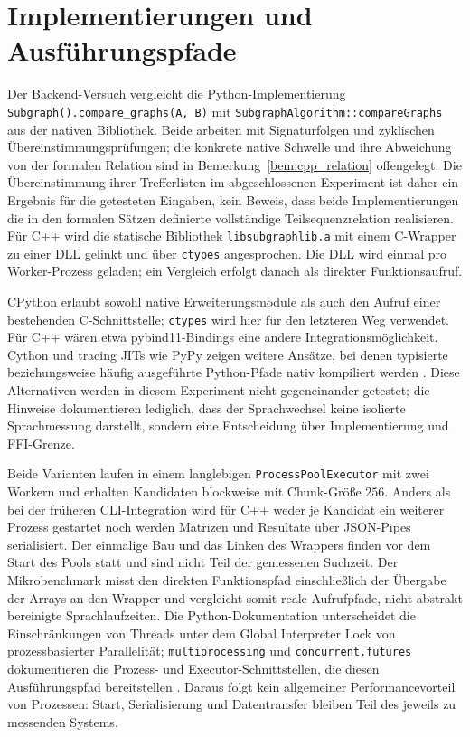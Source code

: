 \documentclass[a4paper,12pt, twoside]{report}
\theoremstyle{definition}
\begin{document}
\section{Implementierungen und Ausführungspfade}
\label{sec:backend_implementierungen}

Der Backend-Versuch vergleicht die Python-Implementierung \texttt{Subgraph().compare\_graphs(A, B)} mit \texttt{SubgraphAlgorithm::compareGraphs} aus der nativen Bibliothek. Beide arbeiten mit Signaturfolgen und zyklischen Übereinstimmungsprüfungen; die konkrete native Schwelle und ihre Abweichung von der formalen Relation sind in Bemerkung~\ref{bem:cpp_relation} offengelegt. Die Übereinstimmung ihrer Trefferlisten im abgeschlossenen Experiment ist daher ein Ergebnis für die getesteten Eingaben, kein Beweis, dass beide Implementierungen die in den formalen Sätzen definierte vollständige Teilsequenzrelation realisieren. Für C++ wird die statische Bibliothek \texttt{libsubgraphlib.a} mit einem C-Wrapper zu einer DLL gelinkt und über \texttt{ctypes} angesprochen. Die DLL wird einmal pro Worker-Prozess geladen; ein Vergleich erfolgt danach als direkter Funktionsaufruf.

CPython erlaubt sowohl native Erweiterungsmodule als auch den Aufruf einer bestehenden C-Schnittstelle; \texttt{ctypes} wird hier für den letzteren Weg verwendet. Für C++ wären etwa pybind11-Bindings eine andere Integrationsmöglichkeit. Cython und tracing JITs wie PyPy zeigen weitere Ansätze, bei denen typisierte beziehungsweise häufig ausgeführte Python-Pfade nativ kompiliert werden \cite{python314extending,python314ctypes,pybind11docs,behnel2011cython,bolz2009pypy}. Diese Alternativen werden in diesem Experiment nicht gegeneinander getestet; die Hinweise dokumentieren lediglich, dass der Sprachwechsel keine isolierte Sprachmessung darstellt, sondern eine Entscheidung über Implementierung und FFI-Grenze.

Beide Varianten laufen in einem langlebigen \texttt{ProcessPoolExecutor} mit zwei Workern und erhalten Kandidaten blockweise mit Chunk-Größe $256$. Anders als bei der früheren CLI-Integration wird für C++ weder je Kandidat ein weiterer Prozess gestartet noch werden Matrizen und Resultate über JSON-Pipes serialisiert. Der einmalige Bau und das Linken des Wrappers finden vor dem Start des Pools statt und sind nicht Teil der gemessenen Suchzeit. Der Mikrobenchmark misst den direkten Funktionspfad einschließlich der Übergabe der Arrays an den Wrapper und vergleicht somit reale Aufrufpfade, nicht abstrakt bereinigte Sprachlaufzeiten. Die Python-Dokumentation unterscheidet die Einschränkungen von Threads unter dem Global Interpreter Lock von prozessbasierter Parallelität; \texttt{multiprocessing} und \texttt{concurrent.futures} dokumentieren die Prozess- und Executor-Schnittstellen, die diesen Ausführungspfad bereitstellen \cite{python314gil,python314multiprocessing,python314futures}. Daraus folgt kein allgemeiner Performancevorteil von Prozessen: Start, Serialisierung und Datentransfer bleiben Teil des jeweils zu messenden Systems.
\end{document}
